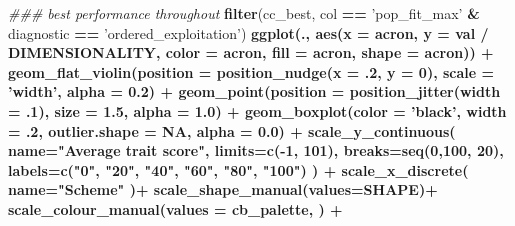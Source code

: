 \documentclass[]{book}
\newenvironment{Shaded}{\begin{snugshade}}{\end{snugshade}}
\newcommand{\CommentTok}[1]{\textcolor[rgb]{0.56,0.35,0.01}{\textit{#1}}}
\newcommand{\DataTypeTok}[1]{\textcolor[rgb]{0.13,0.29,0.53}{#1}}
\newcommand{\DecValTok}[1]{\textcolor[rgb]{0.00,0.00,0.81}{#1}}
\newcommand{\FloatTok}[1]{\textcolor[rgb]{0.00,0.00,0.81}{#1}}
\newcommand{\KeywordTok}[1]{\textcolor[rgb]{0.13,0.29,0.53}{\textbf{#1}}}
\newcommand{\NormalTok}[1]{#1}
\newcommand{\OperatorTok}[1]{\textcolor[rgb]{0.81,0.36,0.00}{\textbf{#1}}}
\newcommand{\OtherTok}[1]{\textcolor[rgb]{0.56,0.35,0.01}{#1}}
\newcommand{\StringTok}[1]{\textcolor[rgb]{0.31,0.60,0.02}{#1}}
\begin{document}
\begin{Shaded}
\begin{Highlighting}[]
\CommentTok{### best performance throughout}
\KeywordTok{filter}\NormalTok{(cc_best, col }\OperatorTok{==}\StringTok{ 'pop_fit_max'} \OperatorTok{&}\StringTok{ }\NormalTok{diagnostic }\OperatorTok{==}\StringTok{ 'ordered_exploitation'}\NormalTok{) }\OperatorTok{%>%}
\StringTok{  }\KeywordTok{ggplot}\NormalTok{(., }\KeywordTok{aes}\NormalTok{(}\DataTypeTok{x =}\NormalTok{ acron, }\DataTypeTok{y =}\NormalTok{ val }\OperatorTok{/}\StringTok{ }\NormalTok{DIMENSIONALITY, }\DataTypeTok{color =}\NormalTok{ acron, }\DataTypeTok{fill =}\NormalTok{ acron, }\DataTypeTok{shape =}\NormalTok{ acron)) }\OperatorTok{+}
\StringTok{  }\KeywordTok{geom_flat_violin}\NormalTok{(}\DataTypeTok{position =} \KeywordTok{position_nudge}\NormalTok{(}\DataTypeTok{x =} \FloatTok{.2}\NormalTok{, }\DataTypeTok{y =} \DecValTok{0}\NormalTok{), }\DataTypeTok{scale =} \StringTok{'width'}\NormalTok{, }\DataTypeTok{alpha =} \FloatTok{0.2}\NormalTok{) }\OperatorTok{+}
\StringTok{  }\KeywordTok{geom_point}\NormalTok{(}\DataTypeTok{position =} \KeywordTok{position_jitter}\NormalTok{(}\DataTypeTok{width =} \FloatTok{.1}\NormalTok{), }\DataTypeTok{size =} \FloatTok{1.5}\NormalTok{, }\DataTypeTok{alpha =} \FloatTok{1.0}\NormalTok{) }\OperatorTok{+}
\StringTok{  }\KeywordTok{geom_boxplot}\NormalTok{(}\DataTypeTok{color =} \StringTok{'black'}\NormalTok{, }\DataTypeTok{width =} \FloatTok{.2}\NormalTok{, }\DataTypeTok{outlier.shape =} \OtherTok{NA}\NormalTok{, }\DataTypeTok{alpha =} \FloatTok{0.0}\NormalTok{) }\OperatorTok{+}
\StringTok{  }\KeywordTok{scale_y_continuous}\NormalTok{(}
    \DataTypeTok{name=}\StringTok{"Average trait score"}\NormalTok{,}
    \DataTypeTok{limits=}\KeywordTok{c}\NormalTok{(}\OperatorTok{-}\DecValTok{1}\NormalTok{, }\DecValTok{101}\NormalTok{),}
    \DataTypeTok{breaks=}\KeywordTok{seq}\NormalTok{(}\DecValTok{0}\NormalTok{,}\DecValTok{100}\NormalTok{, }\DecValTok{20}\NormalTok{),}
    \DataTypeTok{labels=}\KeywordTok{c}\NormalTok{(}\StringTok{"0"}\NormalTok{, }\StringTok{"20"}\NormalTok{, }\StringTok{"40"}\NormalTok{, }\StringTok{"60"}\NormalTok{, }\StringTok{"80"}\NormalTok{, }\StringTok{"100"}\NormalTok{)}
\NormalTok{  ) }\OperatorTok{+}
\StringTok{  }\KeywordTok{scale_x_discrete}\NormalTok{(}
    \DataTypeTok{name=}\StringTok{"Scheme"}
\NormalTok{  )}\OperatorTok{+}
\StringTok{  }\KeywordTok{scale_shape_manual}\NormalTok{(}\DataTypeTok{values=}\NormalTok{SHAPE)}\OperatorTok{+}
\StringTok{  }\KeywordTok{scale_colour_manual}\NormalTok{(}\DataTypeTok{values =}\NormalTok{ cb_palette, ) }\OperatorTok{+}
}
\end{Highlighting}
\end{Shaded}
\end{document}
